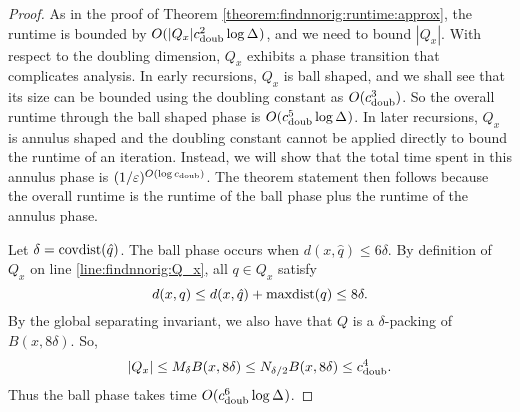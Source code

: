 \documentclass[thesis.tex]{subfiles}
\newcommand{\dist}[2]{\distf({#1},{#2})}
\newcommand{\distf}{d}
\newcommand{\aspect}[1]{\Delta_{#1}}
\newcommand{\cdoub}{c_\textnormal{doub}}
\newcommand{\mkfunction}[1]{\ifmmode{\textnormal{{#1}}}}
\newcommand{\covdist}[1]    {\mkfunction{covdist}({#1})}
\newcommand{\maxdist}[1]    {\mkfunction{maxdist}({#1})}
\begin{document}
\begin{proof}
    As in the proof of Theorem \ref{theorem:findnnorig:runtime:approx}, 
    the runtime is bounded by $O(|Q_x|\cdoub^2\log\aspect{})$,
    and we need to bound $|Q_x|$.
    With respect to the doubling dimension,
    $Q_x$ exhibits a phase transition that complicates analysis.
    In early recursions, $Q_x$ is ball shaped,
    and we shall see that its size can be bounded using the doubling constant as $O(\cdoub^3)$.
    So the overall runtime through the ball shaped phase is $O(\cdoub^5\log\aspect{})$.
    In later recursions, $Q_x$ is annulus shaped and the doubling constant cannot be applied directly to bound the runtime of an iteration.
    Instead, we will show that the total time spent in this annulus phase is $(1/\varepsilon)^{O(\log \cdoub)}$. 
    The theorem statement then follows because the overall runtime is the runtime of the ball phase plus the runtime of the annulus phase.

    Let $\delta = \covdist{\hat q}$.
    The ball phase occurs when $\dist{x}{\hat q} \le 6\delta$.
    By definition of $Q_x$ on line \ref{line:findnnorig:Q_x}, all $q\in Q_x$ satisfy
    \begin{equation}
        \dist{x}{q} \le \dist{x}{\hat q} + \maxdist{q} \le 8\delta
        .
    \end{equation}
    By the global separating invariant,
    we also have that $Q$ is a $\delta$-packing of $B(x,8\delta)$.
    So,
    \begin{equation}
        |Q_x| 
        \le M_\delta B(x,8\delta) 
        \le N_{\delta/2}B(x,8\delta) 
        \le \cdoub^4
        .
    \end{equation}
    Thus the ball phase takes time $O(\cdoub^6\log\aspect{})$.


\end{proof}
\end{document}
